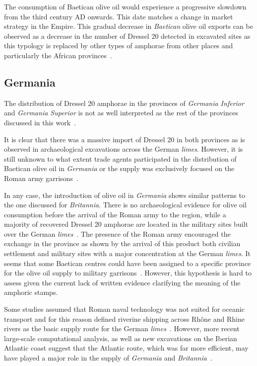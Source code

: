 The consumption of Baetican olive oil would experience a progressive slowdown from the third century AD onwards. This date matches a change in market strategy in the Empire. This gradual decrease in \textit{Baetican} olive oil exports can be observed as a decrease in the number of Dressel 20 detected in excavated sites as this typology is replaced by other types of amphorae from other places and particularly the African provinces~\citep{rodriguez1991aceite,millet_anforas_1998}.

\subsection{Germania}
\label{sec:4}

The distribution of Dressel 20 amphorae in the provinces of \textit{Germania Inferior} and \textit{Germania Superior} is not as well interpreted as the rest of the provinces discussed in this work~\citep[293]{remesal_baetica_2002}. 

It is clear that there was a massive import of Dressel 20 in both provinces as is observed in archaeological excavations across the German \textit{limes}. However, it is still unknown to what extent trade agents participated in the distribution of Baetican olive oil in \textit{Germania} or the supply was exclusively focused on the Roman army garrisons~\citep[156]{remesal_germn_2010}.

In any case, the introduction of olive oil in \textit{Germania} shows similar patterns to the one discussed for \textit{Britannia}. There is no archaeological evidence for olive oil consumption before the arrival of the Roman army to the region, while a majority of recovered Dressel 20 amphorae are located in the military sites built over the German \textit{limes}~\citep{remesal_germaniaengl_2002}. The presence of the Roman army encouraged the exchange in the province as shown by the arrival of this product both civilian settlement and military sites with a major concentration at the German \textit{limes}. It seems that some Baetican centres could have been assigned to a specific province for the olive oil supply to military garrisons~\citep[125]{remesal_concierto}. However, this hypothesis is hard to assess given the current lack of written evidence clarifying the meaning of the amphoric stamps. 

Some studies assumed that Roman naval technology was not suited for oceanic transport and for this reason defined riverine shipping across Rh\^one and Rhine rivers as the basic supply route for the German \textit{limes}~\citep{marliere2001tonneau}. However, more recent large-scale computational analysis, as well as new excavations on the Iberian Atlantic coast suggest that the Atlantic route, which was far more efficient, may have played a major role in the supply of \textit{Germania} and \textit{Britannia}~\citep{rubio-campillo_ecology_2018}.


